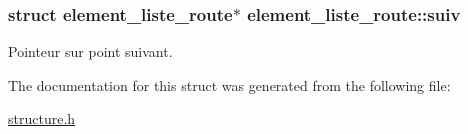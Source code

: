 \subsubsection[{\texorpdfstring{suiv}{suiv}}]{\setlength{\rightskip}{0pt plus 5cm}struct {\bf element\+\_\+liste\+\_\+route}$\ast$ element\+\_\+liste\+\_\+route\+::suiv}\hypertarget{structelement__liste__route_a9a5f54b2de65d5430f34726eb208fd72}{}\label{structelement__liste__route_a9a5f54b2de65d5430f34726eb208fd72}
Pointeur sur point suivant. 

The documentation for this struct was generated from the following file\+:\begin{DoxyCompactItemize}
\item 
\hyperlink{structure_8h}{structure.\+h}\end{DoxyCompactItemize}
